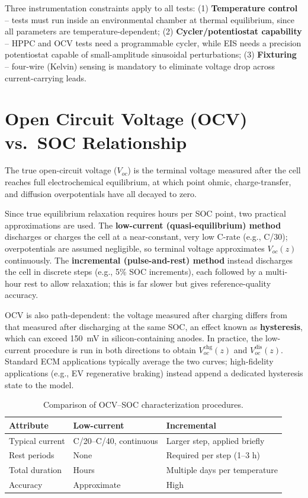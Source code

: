 Three instrumentation constraints apply to all tests: (1) \textbf{Temperature control} -- tests must run inside an environmental chamber at thermal equilibrium, since all parameters are temperature-dependent; (2) \textbf{Cycler/potentiostat capability} -- HPPC and OCV tests need a programmable cycler, while EIS needs a precision potentiostat capable of small-amplitude sinusoidal perturbations; (3) \textbf{Fixturing} -- four-wire (Kelvin) sensing is mandatory to eliminate voltage drop across current-carrying leads.

\section{Open Circuit Voltage (OCV) vs.\ SOC Relationship}
\label{sec:ocv_soc}

The true open-circuit voltage ($V_{oc}$) is the terminal voltage measured after the cell reaches full electrochemical equilibrium, at which point ohmic, charge-transfer, and diffusion overpotentials have all decayed to zero.

Since true equilibrium relaxation requires hours per SOC point, two practical approximations are used. The \textbf{low-current (quasi-equilibrium) method} discharges or charges the cell at a near-constant, very low C-rate (e.g., C/30); overpotentials are assumed negligible, so terminal voltage approximates $V_{oc}(z)$ continuously. The \textbf{incremental (pulse-and-rest) method} instead discharges the cell in discrete steps (e.g., 5\% SOC increments), each followed by a multi-hour rest to allow relaxation; this is far slower but gives reference-quality accuracy.

OCV is also path-dependent: the voltage measured after charging differs from that measured after discharging at the same SOC, an effect known as \textbf{hysteresis}, which can exceed 150~mV in silicon-containing anodes. In practice, the low-current procedure is run in both directions to obtain $V_{oc}^{\text{chg}}(z)$ and $V_{oc}^{\text{dis}}(z)$. Standard ECM applications typically average the two curves; high-fidelity applications (e.g., EV regenerative braking) instead append a dedicated hysteresis state to the model.

\begin{table}[htbp]
\centering
\caption{Comparison of OCV--SOC characterization procedures.}
\label{tab:ocv_methods}
\footnotesize
\begin{tabularx}{\textwidth}{
    >{\raggedright\arraybackslash}p{2.6cm}
    >{\raggedright\arraybackslash}X
    >{\raggedright\arraybackslash}X
}
\toprule
\textbf{Attribute} & \textbf{Low-current} & \textbf{Incremental} \\
\midrule
Typical current & C/20--C/40, continuous & Larger step, applied briefly \\
Rest periods & None & Required per step (1--3 h) \\
Total duration & Hours & Multiple days per temperature \\
Accuracy & Approximate & High \\
\bottomrule
\end{tabularx}
\end{table}

